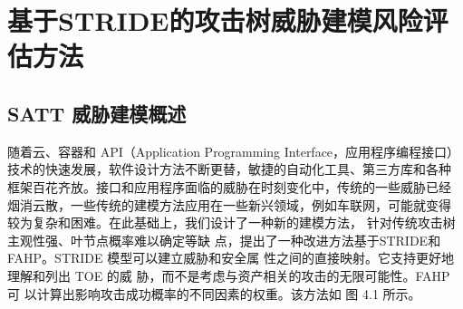 \chapter{基于STRIDE的攻击树威胁建模风险评估方法}
\label{ch4}
\section{SATT 威胁建模概述}
随着云、容器和 API（Application Programming Interface，应用程序编程接口）
技术的快速发展，软件设计方法不断更替，敏捷的自动化工具、第三方库和各种
框架百花齐放。接口和应用程序面临的威胁在时刻变化中，传统的一些威胁已经
烟消云散，一些传统的建模方法应用在一些新兴领域，例如车联网，可能就变得
较为复杂和困难。在此基础上，我们设计了一种新的建模方法，
针对传统攻击树主观性强、叶节点概率难以确定等缺
点，提出了一种改进方法基于STRIDE和 FAHP。STRIDE 模型可以建立威胁和安全属
性之间的直接映射。它支持更好地理解和列出 TOE 的威
胁，而不是考虑与资产相关的攻击的无限可能性。FAHP 可
以计算出影响攻击成功概率的不同因素的权重。该方法如
图 4.1 所示。
